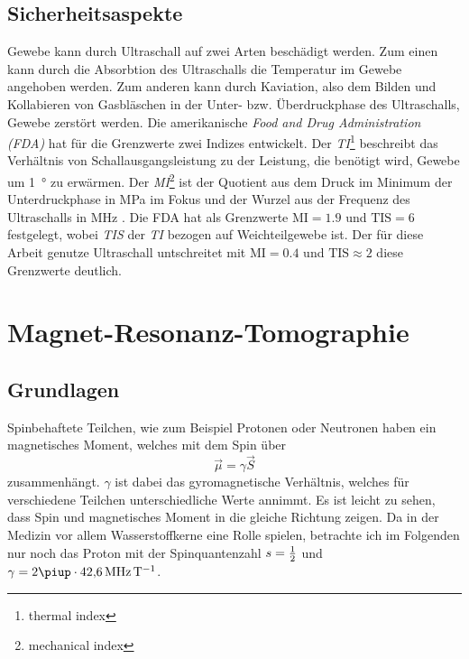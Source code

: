 \documentclass[
    11pt,
    ngerman
]{scrreprt}
\begin{document}
\subsection{Sicherheitsaspekte}

Gewebe kann durch Ultraschall auf zwei Arten beschädigt werden. Zum einen kann
durch die Absorbtion des Ultraschalls die Temperatur im Gewebe angehoben
werden. Zum anderen kann durch Kaviation, also dem Bilden und Kollabieren von
Gasbläschen in der Unter- bzw. Überdruckphase des Ultraschalls, Gewebe zerstört
werden. Die amerikanische \emph{Food and Drug Administration (FDA)} hat für die
Grenzwerte zwei Indizes entwickelt. Der \emph{TI}\footnote{thermal index}
beschreibt das Verhältnis von Schallausgangsleistung zu der Leistung, die
benötigt wird, Gewebe um \SI{1}{\degree} zu erwärmen. Der
\emph{MI}\footnote{mechanical index} ist der Quotient aus dem Druck im Minimum
der Unterdruckphase in \si{\mega\pascal} im Fokus und der Wurzel aus der
Frequenz des Ultraschalls in \si{\mega\hertz}
\parencite{FDA_ultrasound_limits}. Die FDA hat als Grenzwerte
$\text{MI}=\num{1.9}$ und $\text{TIS}=6$ festgelegt, wobei \emph{TIS} der
\emph{TI} bezogen auf Weichteilgewebe ist.
Der für diese Arbeit genutze Ultraschall untschreitet mit $\text{MI}=\num{0.4}$ und $\text{TIS}\approx2$ \parencite{diss_radicke} diese Grenzwerte deutlich.

\section{Magnet-Resonanz-Tomographie}

\subsection{Grundlagen}

Spinbehaftete Teilchen, wie zum Beispiel Protonen oder Neutronen haben ein magnetisches Moment, welches mit dem Spin über
\[
    \vec\mu = \gamma\vec S
\]
zusammenhängt. $\gamma$ ist dabei das gyromagnetische Verhältnis, welches für
verschiedene Teilchen unterschiedliche Werte annimmt. Es ist leicht zu sehen,
dass Spin und magnetisches Moment in die gleiche Richtung zeigen. Da in der
Medizin vor allem Wasserstoffkerne eine Rolle spielen, betrachte ich im
Folgenden nur noch das Proton mit der Spinquantenzahl $s = \frac 12$ und $\gamma =
2\piup\cdot\SI{42.6}{\mega\hertz\per\tesla}$.
\end{document}
